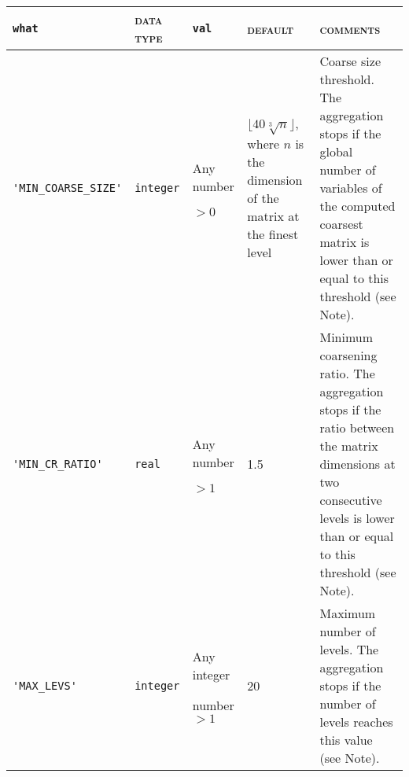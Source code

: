 \bsideways
\begin{center}
\begin{tabular}{|p{3.9cm}|l|p{2.3cm}|p{2.9cm}|p{6.9cm}|}
\hline
\verb|what|              & \textsc{data type}        &  \verb|val|      &  \textsc{default}  &
\textsc{comments} \\ \hline
\verb|'MIN_COARSE_SIZE'| & \verb|integer|
                         & Any number \par $> 0$
                         & $\lfloor 40 \sqrt[3]{n} \rfloor$, where $n$ is the dimension
                            of the matrix at the finest level
                         & Coarse size threshold. The aggregation stops
                            if  the global number of variables of the
                            computed coarsest matrix
                            is lower than or equal to this threshold
                           (see Note).
                           \\ \hline  
\verb|'MIN_CR_RATIO'| & \verb|real|
                         & Any number \par $> 1$
                         & 1.5
                         & Minimum coarsening ratio. The aggregation stops
                            if the ratio between the matrix dimensions
                            at two consecutive levels is lower than or equal to this
                            threshold (see Note).\\ \hline   
\verb|'MAX_LEVS'| & \verb|integer|
                         & Any integer \par number $> 1$
                         & 20
                         & Maximum number of levels. The aggregation stops
                           if the number of levels reaches this value (see Note). \\ \hline  

\end{tabular}
\end{center}
